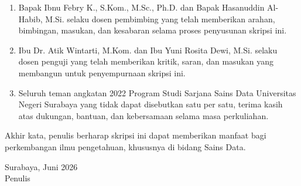 \documentclass{SkripsiUnesa}
\begin{document}
\begin{enumerate}[label=\arabic*., leftmargin=0.75cm, itemsep=6pt]
    \item Bapak Ibnu Febry K., S.Kom., M.Sc., Ph.D. dan Bapak Hasanuddin Al-Habib, M.Si. selaku dosen pembimbing yang telah memberikan arahan, bimbingan, masukan, dan kesabaran selama proses penyusunan skripsi ini.
    \item Ibu Dr. Atik Wintarti, M.Kom. dan Ibu Yuni Rosita Dewi, M.Si. selaku dosen penguji yang telah memberikan kritik, saran, dan masukan yang membangun untuk penyempurnaan skripsi ini.
    \item Seluruh teman angkatan 2022 Program Studi Sarjana Sains Data Universitas Negeri Surabaya yang tidak dapat disebutkan satu per satu, terima kasih atas dukungan, bantuan, dan kebersamaan selama masa perkuliahan.
\end{enumerate}

Akhir kata, penulis berharap skripsi ini dapat memberikan manfaat bagi perkembangan ilmu pengetahuan, khususnya di bidang Sains Data.

\vspace{1cm}
\begin{flushright}
    Surabaya, Juni 2026\\
    \vspace{1.5cm}
    Penulis
\end{flushright}
\end{document}
